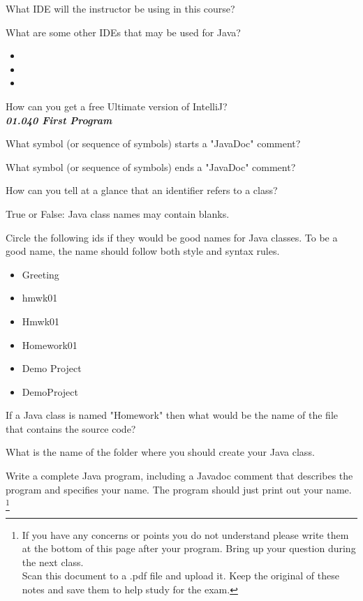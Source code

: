 \documentclass[letterpaper,11pt]{exam}
\begin{document}
\begin{questions}
\question What IDE will the instructor be using in this course?

\begin{samepage}
    \question What are some other IDEs that may be used for Java?
    \begin{itemize}
        \item 
        \item 
        \item 
    \end{itemize}
\end{samepage}

\question How can you get a free Ultimate version of IntelliJ?\\

\textit{\textbf{01.040 First Program}}

\question What symbol (or sequence of symbols) starts a "JavaDoc" comment?

\question What symbol (or sequence of symbols) ends a "JavaDoc" comment?

\question How can you tell at a glance that an identifier refers to a class?

\question True or False:  Java class names may contain blanks.

\begin{samepage}
    \question Circle the following ids if they would be good names for Java classes.  To be a good name, the name should follow both style and syntax rules.
    \begin{itemize}
        \item Greeting
        \item hmwk01
        \item Hmwk01
        \item Homework01
        \item Demo Project
        \item DemoProject
    \end{itemize}
\end{samepage}

\question If a Java class is named "Homework" then what would be the name of the file that contains the source code? \makebox[4cm]{\hrulefill}

\question What is the name of the folder where you should create your Java class.

\newpage
\question Write a complete Java program, including a Javadoc comment that describes the program and specifies your name.  The program should just print out your name.
\footnote{  If you have any concerns or points you do not understand please write them at the bottom of this page after your program. Bring up your question during the next class. \\Scan this document to a .pdf file and upload it.  Keep the original of these notes and save them to help study for the exam.}



\end{questions}
\end{document}
